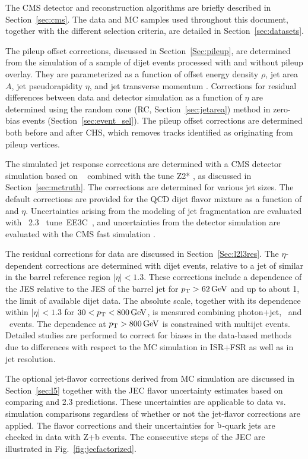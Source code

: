 \documentclass[11pt,twoside,a4paper,cmspaper,final,collab]{cms-tdr}
\begin{document}
The CMS detector and reconstruction algorithms are briefly described in Section~\ref{sec:cms}. The data and MC samples used throughout this document, together with the different selection criteria, are detailed in Section~\ref{sec:datasets}.

The pileup offset corrections, discussed in Section~\ref{Sec:pileup}, are determined from the simulation of a sample of dijet events processed with and without pileup overlay. They are parameterized as a function of offset energy density $\rho$, jet area $A$, jet pseudorapidity $\eta$, and jet transverse momentum \pt. Corrections for residual differences between data and detector simulation as a function of $\eta$ are determined using the random cone (RC, Section~\ref{sec:jetarea}) method in zero-bias events (Section~\ref{sec:event_sel}). The pileup offset corrections are determined both before and after CHS, which removes tracks identified as originating from pileup vertices.

The simulated jet response corrections are determined with a CMS detector simulation based on {\GEANTfour}~\cite{Agostinelli:2002hh} combined with the {} \cite{Sjostrand:2006za} tune Z2* \cite{GEN-14-001}, as discussed in Section~\ref{sec:mctruth}.
The corrections are determined for various jet sizes. The default corrections are provided for the QCD dijet flavor mixture as a function of \pt and $\eta$. Uncertainties arising from the modeling of jet fragmentation are evaluated with {\HERWIGpp}~2.3~\cite{Bahr:2008pv} tune~EE3C~\cite{Gieseke:2012ft}, and uncertainties from the detector simulation are evaluated with the CMS fast simulation \cite{Giammanco:2014bza}.

The residual corrections for data are discussed in Section~\ref{Sec:l2l3res}.
The $\eta$-dependent corrections are determined with dijet events, relative to a jet of similar \pt in the barrel reference region $ \vert \eta \vert <1.3$. These corrections include a \pt dependence of the JES relative to the JES of the barrel jet for $p_{\mathrm{T}}>62\,\text{Ge\hspace{-.08em}V}$ and up to about 1\TeV, the limit of available dijet data. The absolute scale, together with its \pt dependence within $ \vert \eta \vert <1.3$ for $30<p_{\mathrm{T}}<800\,\text{Ge\hspace{-.08em}V}$, is measured combining photon+jet, \zmmjet\ and \zeejet\ events. The \pt dependence at $p_{\mathrm{T}}>800\,\text{Ge\hspace{-.08em}V}$ is constrained with multijet events.
Detailed studies are performed to correct for biases in the data-based methods
due to differences with respect to the MC simulation in ISR+FSR as well as in jet \pt resolution.

The optional jet-flavor corrections derived from MC simulation are discussed in Section~\ref{sec:l5} together with the JEC flavor uncertainty estimates based on comparing {} and {\HERWIGpp}2.3 predictions. These uncertainties are applicable to data vs. simulation comparisons regardless of whether or not the jet-flavor corrections are applied. The flavor corrections and their uncertainties for $\mathrm{b}$-quark jets are checked in data with Z+b events.
The consecutive steps of the JEC are illustrated in Fig.~\ref{fig:jecfactorized}.
\end{document}

